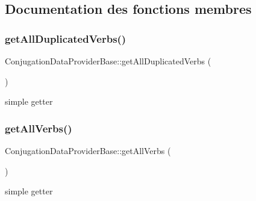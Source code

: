 \subsection{Documentation des fonctions membres}
\hypertarget{class_conjugation_data_provider_base_a645b9064803b3f6b9796fbacdb26548b}{}\label{class_conjugation_data_provider_base_a645b9064803b3f6b9796fbacdb26548b} 
\subsubsection{\texorpdfstring{get\+All\+Duplicated\+Verbs()}{getAllDuplicatedVerbs()}}
{\footnotesize\ttfamily Conjugation\+Data\+Provider\+Base\+::get\+All\+Duplicated\+Verbs (\begin{DoxyParamCaption}{ }\end{DoxyParamCaption})\hspace{0.3cm}{\ttfamily [abstract]}}

simple getter \hypertarget{class_conjugation_data_provider_base_af3d127433543eb86878447357d6382d4}{}\label{class_conjugation_data_provider_base_af3d127433543eb86878447357d6382d4} 
\subsubsection{\texorpdfstring{get\+All\+Verbs()}{getAllVerbs()}}
{\footnotesize\ttfamily Conjugation\+Data\+Provider\+Base\+::get\+All\+Verbs (\begin{DoxyParamCaption}{ }\end{DoxyParamCaption})\hspace{0.3cm}{\ttfamily [abstract]}}

simple getter \hypertarget{class_conjugation_data_provider_base_a3649ad489ccc588dccf840445c7432eb}{}\label{class_conjugation_data_provider_base_a3649ad489ccc588dccf840445c7432eb} 
